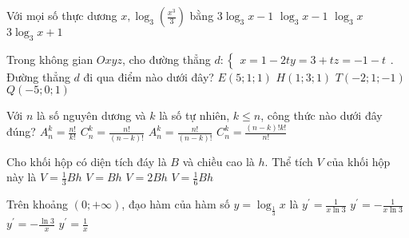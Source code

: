 \begin{ex} 
 Với mọi số thực dương $x, \log _{3}\left(\frac{x^{3}}{3}\right)$ bằng
\choice 
 { $3 \log _{3} x-1$} 
 { $\log _{3} x-1$} 
 { $\log _{3} x$} 
 { $3 \log _{3} x+1$}
\end{ex} 
 
\begin{ex} 
 {
 }
\end{ex} 
 
\begin{ex} 
 Trong không gian $O x y z$, cho đường thẳng $d:\left\{\begin{array}{l}x=1-2 t y=3+t z=-1-t\end{array}\right.$. Đường thẳng $d$ đi qua điểm nào dưới đây?
\choice 
 { $E(5 ; 1 ; 1)$} 
 { $H(1 ; 3 ; 1)$} 
 { $T(-2 ; 1 ;-1)$} 
 { $Q(-5 ; 0 ; 1)$}
\end{ex} 
 
\begin{ex} 
 Với $n$ là số nguyên dương và $k$ là số tự nhiên, $k \leq n$, công thức nào dưới đây đúng?
\choice 
 { $A_{n}^{k}=\frac{n !}{k !}$} 
 { $C_{n}^{k}=\frac{n !}{(n-k) !}$} 
 { $A_{n}^{k}=\frac{n !}{(n-k) !}$} 
 { $C_{n}^{k}=\frac{(n-k) ! k !}{n !}$}
\end{ex} 
 
\begin{ex} 
 Cho khối hộp có diện tích đáy là $B$ và chiều cao là $h$. Thể tích $V$ của khối hộp này là
\choice 
 { $V=\frac{1}{3} B h$} 
 { $V=B h$} 
 { $V=2 B h$} 
 { $V=\frac{1}{6} B h$}
\end{ex} 
 
\begin{ex} 
 Trên khoảng $(0 ;+\infty)$, đạo hàm của hàm số $y=\log _{\frac{1}{3}} x$ là
\choice 
 { $y^{\prime}=\frac{1}{x \ln 3}$} 
 { $y^{\prime}=-\frac{1}{x \ln 3}$} 
 { $y^{\prime}=-\frac{\ln 3}{x}$} 
 { $y^{\prime}=\frac{1}{x}$}
\end{ex} 
 
